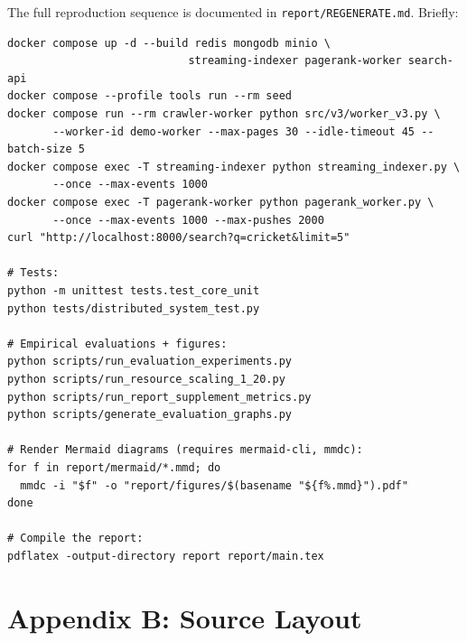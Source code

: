 \documentclass[11pt,a4paper]{article}
\newcommand{\code}[1]{\texttt{#1}}
\begin{document}
The full reproduction sequence is documented in \code{report/REGENERATE.md}. Briefly:

\begin{verbatim}
docker compose up -d --build redis mongodb minio \
                            streaming-indexer pagerank-worker search-api
docker compose --profile tools run --rm seed
docker compose run --rm crawler-worker python src/v3/worker_v3.py \
       --worker-id demo-worker --max-pages 30 --idle-timeout 45 --batch-size 5
docker compose exec -T streaming-indexer python streaming_indexer.py \
       --once --max-events 1000
docker compose exec -T pagerank-worker python pagerank_worker.py \
       --once --max-events 1000 --max-pushes 2000
curl "http://localhost:8000/search?q=cricket&limit=5"

# Tests:
python -m unittest tests.test_core_unit
python tests/distributed_system_test.py

# Empirical evaluations + figures:
python scripts/run_evaluation_experiments.py
python scripts/run_resource_scaling_1_20.py
python scripts/run_report_supplement_metrics.py
python scripts/generate_evaluation_graphs.py

# Render Mermaid diagrams (requires mermaid-cli, mmdc):
for f in report/mermaid/*.mmd; do
  mmdc -i "$f" -o "report/figures/$(basename "${f%.mmd}").pdf"
done

# Compile the report:
pdflatex -output-directory report report/main.tex
\end{verbatim}

\section{Appendix B: Source Layout}
\end{document}

